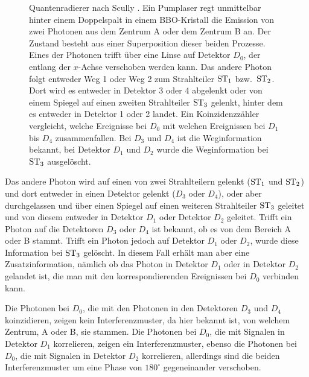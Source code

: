 \begin{figure}[htb]
\caption{\label{fig_Scully}%
Quantenradierer nach Scully \cite{Kim}. Ein Pumplaser regt unmittelbar hinter einem Doppelspalt in einem
BBO-Kristall die Emission von zwei Photonen aus dem Zentrum A oder dem Zentrum B an. Der Zustand besteht
aus einer Superposition dieser beiden Prozesse. Eines der Photonen trifft \"uber eine Linse auf 
Detektor $D_0$, der entlang
der $x$-Achse verschoben werden kann. Das andere Photon folgt entweder Weg 1 oder Weg 2 zum
Strahlteiler ${\rm ST}_1$ bzw.\ ${\rm ST}_2$. Dort wird es entweder in Detektor 3 oder 4 abgelenkt oder
von einem Spiegel auf einen zweiten Strahlteiler ${\rm ST}_3$ gelenkt, hinter dem es entweder in
Detektor 1 oder 2 landet. Ein Koinzidenzz\"ahler vergleicht, welche Ereignisse bei $D_0$ mit welchen
Ereignissen bei $D_1$ bis $D_4$ zusammenfallen. Bei $D_3$ und $D_4$ ist die Weginformation bekannt, bei
Detektor $D_1$ und $D_2$ wurde die Weginformation bei ${\rm ST}_3$ ausgel\"oscht.}
\end{figure}

Das andere Photon wird auf einen von zwei Strahlteilern gelenkt (${\rm ST}_1$ und ${\rm ST}_2$)
und dort entweder in einen Detektor gelenkt ($D_3$ oder $D_4$), oder aber durchgelassen
und \"uber einen Spiegel auf einen weiteren Strahlteiler ${\rm ST}_3$ geleitet und von diesem
entweder in Detektor $D_1$ oder Detektor $D_2$ geleitet. Trifft ein Photon auf die Detektoren
$D_3$ oder $D_4$ ist bekannt, ob es von dem Bereich A oder B stammt. Trifft ein Photon jedoch
auf Detektor $D_1$ oder $D_2$, wurde diese Information bei ${\rm ST}_3$ gel\"oscht. In diesem
Fall erh\"alt man aber eine Zusatzinformation, n\"amlich ob das Photon
in Detektor $D_1$ oder in Detektor $D_2$ gelandet ist, die man mit den korrespondierenden 
Ereignissen bei $D_0$ verbinden kann. 

Die Photonen bei $D_0$, die mit den Photonen in den Detektoren $D_3$ und $D_4$
koinzidieren, zeigen kein Interferenzmuster, da hier bekannt ist, von welchem Zentrum,
A oder B, sie stammen. 
Die Photonen bei $D_0$, die mit Signalen in Detektor $D_1$ korrelieren, zeigen ein Interferenzmuster,
ebenso die Photonen bei $D_0$, die mit Signalen in Detektor $D_2$ korrelieren, allerdings sind die
beiden Interferenzmuster um eine Phase von $180^\circ$ gegeneinander verschoben. 

